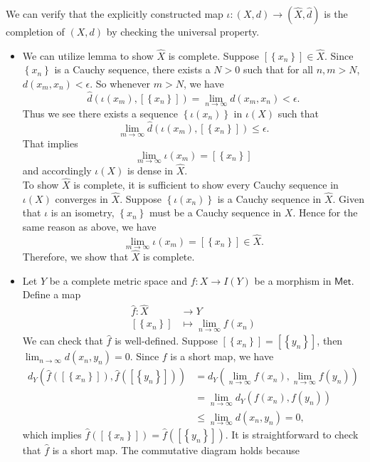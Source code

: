 \documentclass{report}
\begin{document}
\begin{prf} 
	We can verify that the explicitly constructed map $\iota:(X,d)\to\left(\widehat{X},\hat{d}\right)$ is the completion of $(X,d)$ by checking the universal property. 
	\begin{itemize}
		\item We can utilize lemma to show $\widehat{X}$ is complete. Suppose $\left[\left\{x_n\right\}\right]\in \widehat{X}$. Since $\left\{x_n\right\}$ is a Cauchy sequence, there exists a $N>0$ such that for all $n,m>N$, $d(x_m,x_n)<\epsilon$. So whenever $m>N$, we have
	\[
		\hat{d}\left(\iota\left(x_m\right),[\left\{x_n\right\}]\right)=\lim_{n\to\infty}d(x_m,x_n)<\epsilon.
	\]
	Thus we see there exists a sequence $\left\{\iota(x_n)\right\}$ in $\iota(X)$ such that 
	\[
		\lim_{m\to \infty}\hat{d}\left(\iota\left(x_m\right),[\left\{x_n\right\}]\right)\le \epsilon.
	\]
	That implies 
	\[
		\lim_{m\to \infty}\iota\left(x_m\right)= [\left\{x_n\right\}]
	\]
	and accordingly $\iota\left(X\right)$ is dense in $\widehat{X}$.\\
	To show $\widehat{X}$ is complete, it is sufficient to show every Cauchy sequence in $\iota(X)$ converges in $\widehat{X}$. Suppose $\left\{\iota(x_n)\right\}$ is a Cauchy sequence in $\widehat{X}$. Given that $\iota$ is an isometry, $\left\{x_n\right\}$ must be a Cauchy sequence in $X$. Hence for the same reason as above, we have
	\[
		\lim_{m\to \infty}\iota\left(x_m\right)= [\left\{x_n\right\}]\in \widehat{X}.
	\]
	Therefore, we show that $\widehat{X}$ is complete.
	\item Let $Y$ be a complete metric space and $f:X\to I(Y)$ be a morphism in $\mathsf{Met}$. Define a map
	\begin{align*}
		\hat{f}:\widehat{X}&\longrightarrow Y\\
		[\left\{x_n\right\}]&\longmapsto\lim_{n\to\infty}f(x_n)
	\end{align*}
	We can check that $\hat{f}$ is well-defined. Suppose $[\left\{x_n\right\}]=[\left\{y_n\right\}]$, then $\lim_{n\to\infty}d(x_n,y_n)=0$. Since $f$ is a short map, we have
	\begin{align*}
		d_Y\left(\hat{f}\left([\left\{x_n\right\}]\right),\hat{f}\left([\left\{y_n\right\}]\right)\right)&=d_Y\left(\lim_{n\to\infty}f(x_n),\lim_{n\to\infty}f(y_n)\right)\\
		&=\lim_{n\to\infty}d_Y(f(x_n),f(y_n))\\
		&\le \lim_{n\to\infty}d(x_n,y_n)=0,
	\end{align*}
	which implies $\hat{f}\left([\left\{x_n\right\}]\right)=\hat{f}\left([\left\{y_n\right\}]\right)$. It is straightforward to check that $\hat{f}$ is a short map. The commutative diagram holds because

\end{itemize}
\end{prf}
\end{document}
